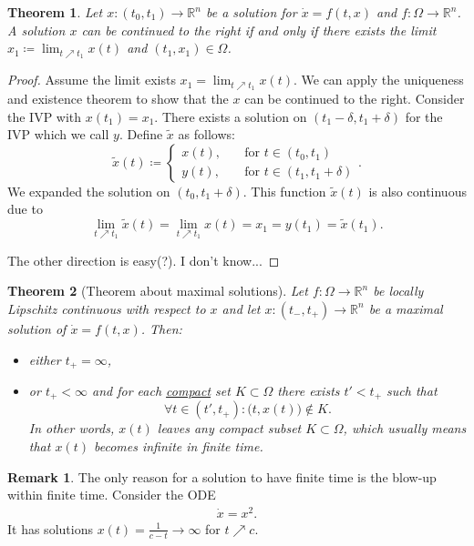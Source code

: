 \documentclass[hidelinks,a4paper, 11pt]{article}
\theoremstyle{plain}
\newtheorem{theorem}{Theorem}
\theoremstyle{break}
\theoremstyle{plain}
\theoremstyle{definition}
\newtheorem*{remark}{Remark}
\begin{document}
\begin{theorem}
	Let $x: (t_0,t_1) \to \mathbb R^n$ be a solution for $\dot x = f(t,x)$ and $f: \Omega \to \mathbb R^n$. A solution $x$ can be continued to the right if and only if there exists the limit $x_1 \coloneqq \lim_{t\nearrow t_1}x(t)$ and $(t_1,x_1) \in \Omega$.
\end{theorem}
\begin{proof}
	Assume the limit exists $x_1 = \lim_{t\nearrow t_1}x(t)$. We can apply the uniqueness and existence theorem to show that the $x$ can be continued to the right. Consider the IVP with $x(t_1) = x_1$. There exists a solution on $(t_1-\delta, t_1 + \delta)$ for the IVP which we call $y$. Define $\tilde x$ as follows:
	\[
		\tilde x(t) \coloneqq \begin{cases}
			x(t), \quad & \text{for $t \in (t_0,t_1)$} \\
			y(t), \quad & \text{for $t \in (t_1,t_1 + \delta)$}
		\end{cases}.
	\]
	We expanded the solution on $(t_0,t_1 + \delta)$. This function $\tilde x(t)$ is also continuous due to $$\lim_{t\nearrow t_1} \tilde x(t) = \lim_{t\nearrow t_1}x(t) = x_1 = y(t_1) = \tilde x(t_1).$$
	
	The other direction is easy(?). I don't know...
\end{proof}

\begin{theorem}[Theorem about maximal solutions]\label{theorem:maximalsolutions}
Let $f: \Omega \to \mathbb R^n$ be locally Lipschitz continuous with respect to $x$ and let $x: (t_-,t_+) \to \mathbb R^n$ be a maximal solution of $\dot x = f(t,x)$. Then:
\begin{itemize}
	\item either $t_+ = \infty$,
	\item or $t_+ < \infty$ and for each \underline{compact} set $K \subset \Omega$ there exists $t' < t_+$ such that
	\[
		\forall t \in (t', t_+): \big(t,x(t)\big) \notin K.
	\]
	In other words, $x(t)$ leaves any compact subset $K \subset \Omega$, which usually means that $x(t)$ becomes infinite in finite time.
\end{itemize}
\end{theorem}

\begin{remark}
	The only reason for a solution to have finite time is the blow-up within finite time. Consider the ODE
	\begin{align} \label{chap2:blowup}
		\dot x = x^2.
	\end{align}
	It has solutions $x(t) = \frac{1}{c-t} \to \infty$ for $t \nearrow c$.
\end{remark}
\end{document}
